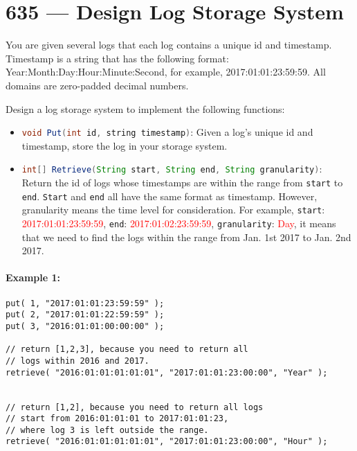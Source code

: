 \section{635 --- Design Log Storage System}
You are given several logs that each log contains a unique id and timestamp. Timestamp is a string that has the following format: Year:Month:Day:Hour:Minute:Second, for example, 2017:01:01:23:59:59. All domains are zero-padded decimal numbers.

Design a log storage system to implement the following functions:

\begin{itemize}
\item \lstinline[language=Java, basicstyle=\small\ttfamily, keywordstyle=\bfseries\color{green!40!black}]|void Put(int id, string timestamp)|: Given a log's unique id and timestamp, store the log in your storage system.

\item \lstinline[language=Java, basicstyle=\small\ttfamily, keywordstyle=\bfseries\color{green!40!black}]|int[] Retrieve(String start, String end, String granularity)|: Return the id of logs whose timestamps are within the range from \texttt{start} to \texttt{end}. \texttt{Start} and \texttt{end} all have the same format as timestamp. However, granularity means the time level for consideration. For example, \texttt{start}: \textcolor{red}{2017:01:01:23:59:59}, \texttt{end}: \textcolor{red}{2017:01:02:23:59:59}, \texttt{granularity}: \textcolor{red}{Day}, it means that we need to find the logs within the range from Jan. 1st 2017 to Jan. 2nd 2017.
\end{itemize}

\paragraph{Example 1:}

\begin{lstlisting}[style=customc]
put( 1, "2017:01:01:23:59:59" );
put( 2, "2017:01:01:22:59:59" );
put( 3, "2016:01:01:00:00:00" );

// return [1,2,3], because you need to return all
// logs within 2016 and 2017.
retrieve( "2016:01:01:01:01:01", "2017:01:01:23:00:00", "Year" );


// return [1,2], because you need to return all logs
// start from 2016:01:01:01 to 2017:01:01:23,
// where log 3 is left outside the range.
retrieve( "2016:01:01:01:01:01", "2017:01:01:23:00:00", "Hour" );
\end{lstlisting}


